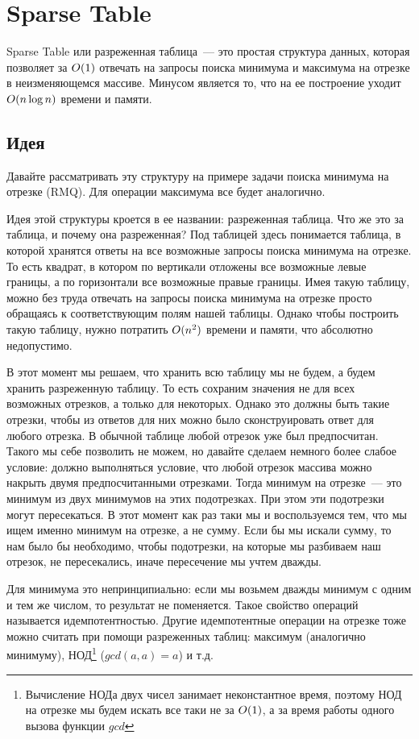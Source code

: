 \chapter{Sparse Table}

Sparse Table или разреженная таблица~--- это простая структура данных, которая позволяет за $O(1)$ отвечать на запросы поиска минимума и максимума на отрезке в неизменяющемся массиве. Минусом является то, что на ее построение уходит $O(n \log n)$ времени и памяти.

\section{Идея}

Давайте рассматривать эту структуру на примере задачи поиска минимума на отрезке (RMQ). Для операции максимума все будет аналогично.

Идея этой структуры кроется в ее названии: разреженная таблица. Что же это за таблица, и почему она разреженная? Под таблицей здесь понимается таблица, в которой хранятся ответы на все возможные запросы поиска минимума на отрезке. То есть квадрат, в котором по вертикали отложены все возможные левые границы, а по горизонтали все возможные правые границы. Имея такую таблицу, можно без труда отвечать на запросы поиска минимума на отрезке просто обращаясь к соответствующим полям нашей таблицы. Однако чтобы построить такую таблицу, нужно потратить $O(n^2)$ времени и памяти, что абсолютно недопустимо.

В этот момент мы решаем, что хранить всю таблицу мы не будем, а будем хранить разреженную таблицу. То есть сохраним значения не для всех возможных отрезков, а только для некоторых. Однако это должны быть такие отрезки, чтобы из ответов для них можно было сконструировать ответ для любого отрезка. В обычной таблице любой отрезок уже был предпосчитан. Такого мы себе позволить не можем, но давайте сделаем немного более слабое условие: должно выполняться условие, что любой отрезок массива можно накрыть двумя предпосчитанными отрезками. Тогда минимум на отрезке~--- это минимум из двух минимумов на этих подотрезках. При этом эти подотрезки могут пересекаться. В этот момент как раз таки мы и воспользуемся тем, что мы ищем именно минимум на отрезке, а не сумму. Если бы мы искали сумму, то нам было бы необходимо, чтобы подотрезки, на которые мы разбиваем наш отрезок, не пересекались, иначе пересечение мы учтем дважды.

Для минимума это непринципиально: если мы возьмем дважды минимум с одним и тем же числом, то результат не поменяется. Такое свойство операций называется идемпотентностью. Другие идемпотентные операции на отрезке тоже можно считать при помощи разреженных таблиц: максимум (аналогично минимуму), НОД\footnote{Вычисление НОДа двух чисел занимает неконстантное время, поэтому НОД на отрезке мы будем искать все таки не за $O(1)$, а за время работы одного вызова функции $gcd$} ($gcd(a, a) = a$) и т.д.

